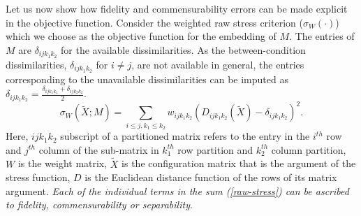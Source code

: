 \documentclass[12pt]{article} %
\begin{document}
Let us now show how fidelity and commensurability errors  can be made explicit in the objective function. Consider the weighted raw stress criterion ($\sigma_{W}(\cdot)$) which we choose as the objective function for the embedding  of  $M$. The entries of $M$ are $\delta_{ijk_1k_2}$ for the available dissimilarities. As the between-condition dissimilarities, 
$\delta_{ijk_1k_2}$ for $i\neq j$, are  not available in general, the entries corresponding to the unavailable dissimilarities can be imputed as $\delta_{ijk_1k_2}=\frac{\delta_{ijk_1k_1}+\delta_{ijk_2k_2}}{2}$.
\begin{equation}
\sigma_{W}(\widetilde{X};M)=\sum_{i\leq j,k_1\leq k_2} {w_{ijk_1k_2}(D_{ijk_1k_2}(\widetilde{X})-\delta_{ijk_1k_2})^2  }\label{raw-stress}.
\end{equation}
 Here, $ijk_1k_2$ subscript of a partitioned matrix refers to the entry in the $i^{th}$ row and $j^{th}$ column of the sub-matrix in $k_1^{th}$ row partition and $k_2^{th}$ column partition, $W$ is the weight matrix, $\widetilde{X}$ is the configuration matrix that is the argument of the stress function, $D$ is the Euclidean distance function of the rows of its matrix argument.   \emph{Each of the individual terms in the sum \textrm{(\ref{raw-stress})} can be ascribed to fidelity, commensurability or separability}. %

\end{document}

